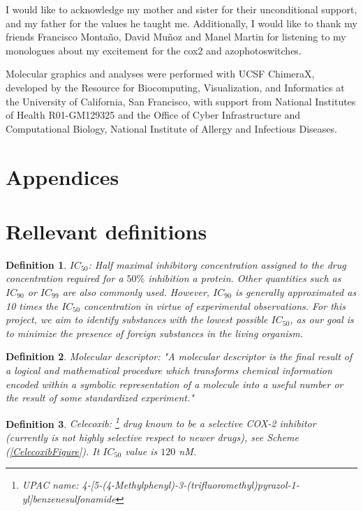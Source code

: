 \documentclass[11pt]{article}
\newtheorem{definition}{Definition}
\begin{document}
I would like to acknowledge my mother and sister for their unconditional support, and my father for the values he taught me. Additionally, I would like to thank my friends Francisco Montaño, David Muñoz and Manel Martin for listening to my monologues about my excitement for the \gls{cox2} and azophotoswitches.

Molecular graphics and analyses were performed with UCSF ChimeraX, developed by the Resource for Biocomputing, Visualization, and Informatics at the University of California, San Francisco, with support from National Institutes of Health R01-GM129325 and the Office of Cyber Infrastructure and Computational Biology, National Institute of Allergy and Infectious Diseases.


\newpage
\thispagestyle{empty}
\mbox{} 
\newpage
\appendix
\section*{\huge Appendices}
\section{Rellevant definitions}\label{appendixRellevantDefinitions}
\begin{definition}\label{definitionIC50}
$IC_{50}$: Half maximal inhibitory concentration assigned to the drug concentration required for a $50\%$ inhibition a protein. Other quantities such as $IC_{90}$ or $IC_{99}$ are also commonly used. However, $IC_{90}$ is generally approximated as 10 times the $IC_{50}$ concentration in virtue of experimental observations\cite{BookIC50}. For this project, we aim to identify substances with the lowest possible $IC_{50}$, as our goal is to minimize the presence of foreign substances in the living organism.
\end{definition}

\begin{definition}\label{definitionChemicalDescriptors}
Molecular descriptor: "A molecular descriptor is the final result of a logical and mathematical procedure which transforms chemical information encoded within a symbolic representation of a molecule into a useful number or the result of some standardized experiment."\cite{DescriptorsBook}
\end{definition}

\begin{definition}\label{definitionCelecoxib}
Celecoxib: \footnote{UPAC name: 4-[5-(4-Methylphenyl)-3-(trifluoromethyl)pyrazol-1-yl]benzenesulfonamide} drug known to be a selective COX-2 inhibitor (currently is not \emph{highly selective} respect to newer drugs), see Scheme (\ref{CelecoxibFigure}). It $IC_{50}$ value is $120$ nM.
\end{definition}
\end{document}
